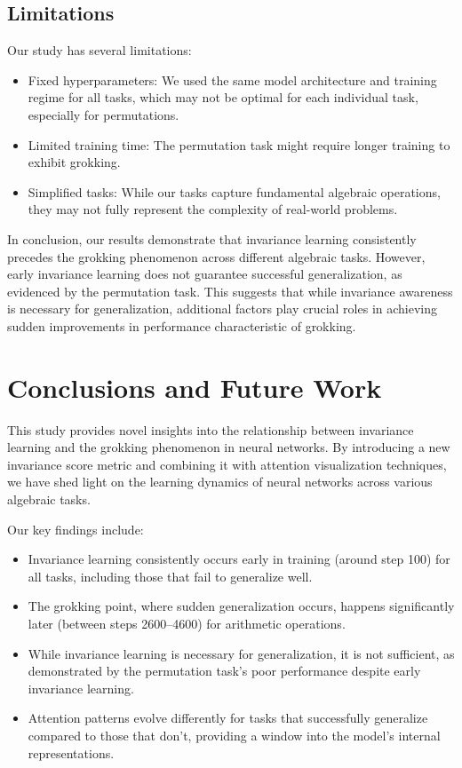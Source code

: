 \documentclass{article} %
\begin{document}
\subsection{Limitations}

Our study has several limitations:
\begin{itemize}
    \item Fixed hyperparameters: We used the same model architecture and training regime for all tasks, which may not be optimal for each individual task, especially for permutations.
    \item Limited training time: The permutation task might require longer training to exhibit grokking.
    \item Simplified tasks: While our tasks capture fundamental algebraic operations, they may not fully represent the complexity of real-world problems.
\end{itemize}

In conclusion, our results demonstrate that invariance learning consistently precedes the grokking phenomenon across different algebraic tasks. However, early invariance learning does not guarantee successful generalization, as evidenced by the permutation task. This suggests that while invariance awareness is necessary for generalization, additional factors play crucial roles in achieving sudden improvements in performance characteristic of grokking.

\section{Conclusions and Future Work}
\label{sec:conclusion}

This study provides novel insights into the relationship between invariance learning and the grokking phenomenon in neural networks. By introducing a new invariance score metric and combining it with attention visualization techniques, we have shed light on the learning dynamics of neural networks across various algebraic tasks.

Our key findings include:
\begin{itemize}
    \item Invariance learning consistently occurs early in training (around step 100) for all tasks, including those that fail to generalize well.
    \item The grokking point, where sudden generalization occurs, happens significantly later (between steps 2600--4600) for arithmetic operations.
    \item While invariance learning is necessary for generalization, it is not sufficient, as demonstrated by the permutation task's poor performance despite early invariance learning.
    \item Attention patterns evolve differently for tasks that successfully generalize compared to those that don't, providing a window into the model's internal representations.
\end{itemize}
\end{document}

